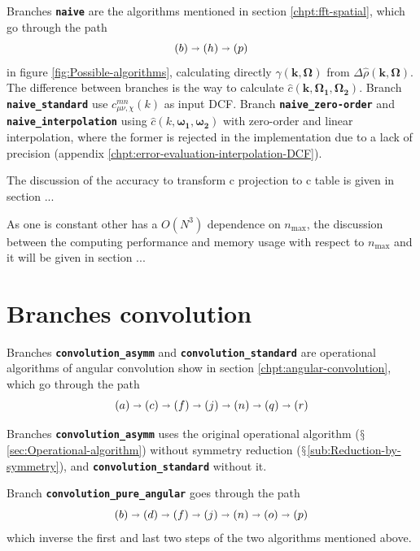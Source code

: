 Branches \texttt{\textbf{naive}} are the algorithms mentioned in section
\ref{chpt:fft-spatial}, which go through the path 
\[
\left(b\right)\shortrightarrow\left(h\right)\shortrightarrow\left(p\right)
\]
 in figure \ref{fig:Possible-algorithms}, calculating directly $\hat{\gamma}(\mathbf{k},\mathbf{\Omega})$
from $\Delta\hat{\rho}(\mathbf{k},\mathbf{\Omega})$. The difference
between branches is the way to calculate $\hat{c}(\mathbf{k},\mathbf{\Omega_{1}},\mathbf{\Omega_{2}})$.
Branch\textbf{ }\texttt{\textbf{naive\_standard}} use $c_{\mu\nu,\chi}^{mn}(k)$
as input \acs{DCF}. Branch \texttt{\textbf{naive\_zero-order}} and
\texttt{\textbf{naive\_interpolation}} using $\hat{c}(k,\boldsymbol{\omega_{1}},\boldsymbol{\omega_{2}})$
with zero-order and linear interpolation, where the former is rejected
in the implementation due to a lack of precision (appendix \ref{chpt:error-evaluation-interpolation-DCF}).

The discussion of the accuracy to transform c projection to c table
is given in section ...

As one is constant other has a $O(N^{3})$ dependence on $n_{\max}$,
the discussion between the computing performance and memory usage
with respect to $n_{\max}$ and it will be given in section ...


\section{Branches \textquotedbl{}convolution\textquotedbl{}}

Branches\textbf{ }\texttt{\textbf{convolution\_asymm}} and \texttt{\textbf{convolution\_standard}}
are operational algorithms of angular convolution show in section
\ref{chpt:angular-convolution}, which go through the path 
\[
\left(a\right)\shortrightarrow\left(c\right)\shortrightarrow\left(f\right)\shortrightarrow\left(j\right)\shortrightarrow\left(n\right)\shortrightarrow\left(q\right)\shortrightarrow\left(r\right)
\]


Branches\textbf{ }\texttt{\textbf{convolution\_asymm}} uses the original
operational algorithm ($\mathsection$\ref{sec:Operational-algorithm})
without symmetry reduction ($\mathsection$\ref{sub:Reduction-by-symmetry}),
and \texttt{\textbf{convolution\_standard}} without it. 

Branch \texttt{\textbf{convolution\_pure\_angular}} goes through the
path 
\[
\left(b\right)\shortrightarrow\left(d\right)\shortrightarrow\left(f\right)\shortrightarrow\left(j\right)\shortrightarrow\left(n\right)\shortrightarrow\left(o\right)\shortrightarrow\left(p\right)
\]
which inverse the first and last two steps of the two algorithms mentioned
above.

